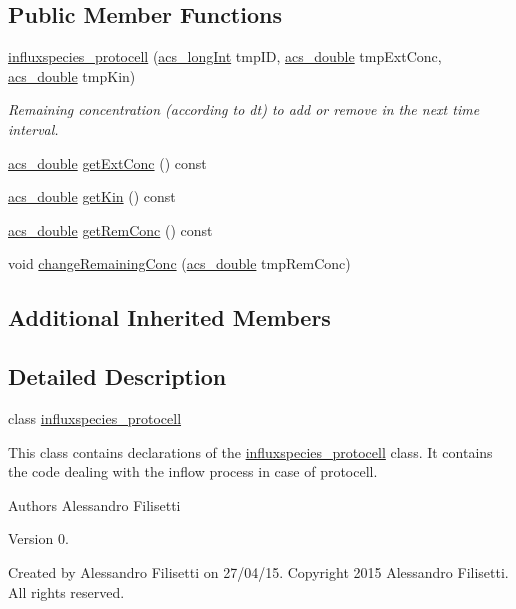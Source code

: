 \subsection*{Public Member Functions}
\begin{DoxyCompactItemize}
\item 
\hyperlink{a00015_a0db73c396ab7d4a61b3c8a79f17d2d88}{influxspecies\-\_\-protocell} (\hyperlink{a00024_a19319d75f02db4308bc5c0026d98cd85}{acs\-\_\-long\-Int} tmp\-I\-D, \hyperlink{a00024_ab776853a005fcbf56af0424a2a4dd607}{acs\-\_\-double} tmp\-Ext\-Conc, \hyperlink{a00024_ab776853a005fcbf56af0424a2a4dd607}{acs\-\_\-double} tmp\-Kin)
\begin{DoxyCompactList}\small\item\em Remaining concentration (according to dt) to add or remove in the next time interval. \end{DoxyCompactList}\item 
\hyperlink{a00024_ab776853a005fcbf56af0424a2a4dd607}{acs\-\_\-double} \hyperlink{a00015_a973ce325110d3baab2794a7f37a0bc3a}{get\-Ext\-Conc} () const 
\item 
\hyperlink{a00024_ab776853a005fcbf56af0424a2a4dd607}{acs\-\_\-double} \hyperlink{a00015_aefa4f5947eab64175f45e72ae658afca}{get\-Kin} () const 
\item 
\hyperlink{a00024_ab776853a005fcbf56af0424a2a4dd607}{acs\-\_\-double} \hyperlink{a00015_a69d83464d8ebc5c52ce6efee8e4c588a}{get\-Rem\-Conc} () const 
\item 
void \hyperlink{a00015_ad092d0a3709e93316dd4325699c34a86}{change\-Remaining\-Conc} (\hyperlink{a00024_ab776853a005fcbf56af0424a2a4dd607}{acs\-\_\-double} tmp\-Rem\-Conc)
\end{DoxyCompactItemize}
\subsection*{Additional Inherited Members}


\subsection{Detailed Description}
class \hyperlink{a00015}{influxspecies\-\_\-protocell} 

This class contains declarations of the \hyperlink{a00015}{influxspecies\-\_\-protocell} class. It contains the code dealing with the inflow process in case of protocell.

\begin{DoxyAuthor}{Authors}
Alessandro Filisetti 
\end{DoxyAuthor}
\begin{DoxyVersion}{Version}
0.
\end{DoxyVersion}
Created by Alessandro Filisetti on 27/04/15. Copyright 2015 Alessandro Filisetti. All rights reserved. 

